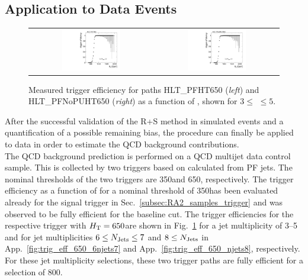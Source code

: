 \subsection{Application to Data Events}
\label{subsec:validation_data_R+S}
\begin{figure}[!t]
  \centering
  \begin{tabular}{cc}
                \includegraphics[width=0.49\textwidth]{figures/turn_on_HT_TagEle27WP80_ProbePFHT650_chs_NJets3-5.pdf} &
                \includegraphics[width=0.49\textwidth]{figures/turn_on_HT_TagEle27WP80_ProbePFNoPUHT650_chs_NJets3-5.pdf} \\
  \end{tabular}
\caption{Measured trigger efficiency for paths HLT\_PFHT650 (\textit{left}) and HLT\_PFNoPUHT650 (\textit{right}) as a function of \HT, shown for $3 \leq$ \NJets $\leq 5$.} 
  \label{fig:trig_eff_650_3njets5}
\end{figure}
After the successful validation of the R+S method in simulated events and a quantification of a possible remaining bias, the procedure can finally be applied to data in order to estimate the QCD background contributions. \\
The QCD background prediction is performed on a QCD multijet data control sample. This is collected by two triggers based on \HT calculated from PF jets. The nominal \HT thresholds of the two triggers are 350\gev and 650\gev, respectively. The trigger efficiency as a function of \HT for a nominal threshold of 350\gev has been evaluated already for the signal trigger in Sec.~\ref{subsec:RA2_samples_trigger} and was observed to be fully efficient for the baseline \HT cut. The trigger efficiencies for the respective trigger with $H_{\text{T}} = 650$\gev are shown in Fig.~\ref{fig:trig_eff_650_3njets5} for a jet multiplicity of 3--5 and for jet multiplicities $6 \leq N_{\text{Jets}} \leq 7$ and $8 \leq N_{\text{Jets}} $ in App.~\ref{fig:trig_eff_650_6njets7} and App.~\ref{fig:trig_eff_650_njets8}, respectively. For these jet multiplicity selections, these two trigger paths are fully efficient for a \HT selection of 800\gev. \\
